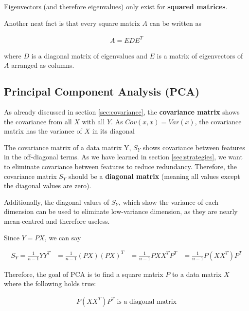 \documentclass[11pt]{article}
\begin{document}
Eigenvectors (and therefore eigenvalues) only exist for \textbf{squared matrices}.

\vspace{10px}

Another neat fact is that every square matrix $A$ can be written as

\begin{align}
    A = EDE^T
\end{align}

where $D$ is a diagonal matrix of eigenvalues and $E$ is a matrix of eigenvectors of $A$ arranged as columns.


\subsection{Principal Component Analysis (PCA)}

As already discussed in section \ref{sec:covariance}, the \textbf{covariance matrix} shows the covariance from all $X$ with all $Y$. As $Cov(x,x) = Var(x)$, the covariance matrix has the variance of $X$ in its diagonal

\vspace{10px}

The covariance matrix of a data matrix Y, $S_Y$ shows covariance between features in the off-diagonal terms. As we have learned in section \ref{sec:strategies}, we want to eliminate covariance between features to reduce redundancy. Therefore, the covariance matrix $S_Y$ should be a \textbf{diagonal matrix} (meaning all values except the diagonal values are zero).

Additionally, the diagonal values of $S_Y$, which show the variance of each dimension can be used to eliminate low-variance dimension, as they are nearly mean-centred and therefore useless.

\vspace{10px}

Since $Y = PX$, we can say

\begin{align*}
    S_Y = \frac{1}{n-1} YY^T & = \frac{1}{n-1} (PX)(PX)^T & = \frac{1}{n-1} PXX^TP^T & = \frac{1}{n-1}P(XX^T)P^T
\end{align*}

Therefore, the goal of PCA is to find a square matrix $P$ to a data matrix $X$ where the following holds true:

\begin{align}
    P(XX^T)P^T \text{  is a diagonal matrix}
\end{align}
\end{document}
